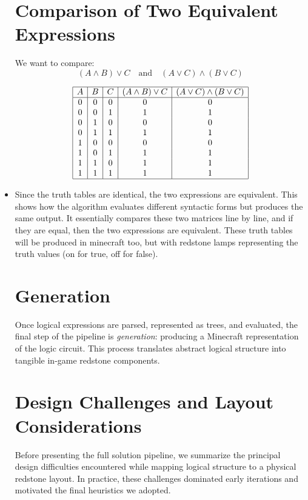 \documentclass[11pt]{diazessay} %
\begin{document}
\begin{itemize}
\section*{Comparison of Two Equivalent Expressions}

We want to compare:
\[
(A \wedge B) \vee C \quad \text{and} \quad (A \vee C) \wedge (B \vee C)
\]

\bigskip

\[
\begin{array}{|c|c|c|c|c|}
\hline
A & B & C & (A \land B) \lor C & (A \lor C) \land (B \lor C) \\
\hline
0 & 0 & 0 & 0 & 0 \\
0 & 0 & 1 & 1 & 1 \\
0 & 1 & 0 & 0 & 0 \\
0 & 1 & 1 & 1 & 1 \\
1 & 0 & 0 & 0 & 0 \\
1 & 0 & 1 & 1 & 1 \\
1 & 1 & 0 & 1 & 1 \\
1 & 1 & 1 & 1 & 1 \\
\hline
\end{array}
\]

\bigskip


\item Since the truth tables are identical, the two expressions are equivalent.  
This shows how the algorithm evaluates different syntactic forms but produces the same output. It essentially compares these two matrices line by line, and if they are equal, then the two expressions are equivalent.
These truth tables will be produced in minecraft too, but with redstone lamps representing the truth values (on for true, off for false).

\section{Generation}

Once logical expressions are parsed, represented as trees, and evaluated,
the final step of the pipeline is \textit{generation}: producing a Minecraft
representation of the logic circuit. This process translates abstract
logical structure into tangible in-game redstone components.

\section{Design Challenges and Layout Considerations}

Before presenting the full solution pipeline, we summarize the principal design
difficulties encountered while mapping logical structure to a physical redstone
layout. In practice, these challenges dominated early iterations and motivated
the final heuristics we adopted.


\end{itemize}
\end{document}
